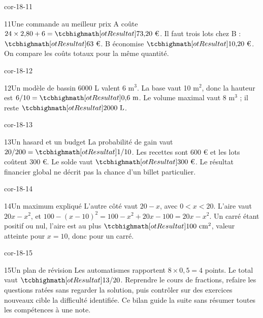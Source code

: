 \begin{blocLivre}{cor-18-11}\begin{corrige}{11}{Une commande au meilleur prix}
A coûte $24\times2{,}80+6=\res{73{,}20\text{ €}}$. Il faut trois lots chez B : $\res{63\text{ €}}$. B économise $\res{10{,}20\text{ €}}$. On compare les coûts totaux pour la même quantité.
\end{corrige}\end{blocLivre}
\begin{blocLivre}{cor-18-12}\begin{corrige}{12}{Un modèle de bassin}
6000 L valent 6 m$^3$. La base vaut 10 m$^2$, donc la hauteur est $6/10=\res{0{,}6\text{ m}}$. Le volume maximal vaut 8 m$^3$ ; il reste $\res{2000\text{ L}}$.
\label{fig-cor-18-12}
\end{corrige}\end{blocLivre}
\begin{blocLivre}{cor-18-13}\begin{corrige}{13}{Un hasard et un budget}
La probabilité de gain vaut $20/200=\res{1/10}$. Les recettes sont 600 € et les lots coûtent 300 €. Le solde vaut $\res{300\text{ €}}$. Le résultat financier global ne décrit pas la chance d’un billet particulier.
\end{corrige}\end{blocLivre}
\begin{blocLivre}{cor-18-14}\begin{corrige}{14}{Un maximum expliqué}
L’autre côté vaut $20-x$, avec $0<x<20$. L’aire vaut $20x-x^2$, et $100-(x-10)^2=100-x^2+20x-100=20x-x^2$. Un carré étant positif ou nul, l’aire est au plus $\res{100\text{ cm}^2}$, valeur atteinte pour $x=10$, donc pour un carré.
\label{fig-cor-18-14}
\end{corrige}\end{blocLivre}
\begin{blocLivre}{cor-18-15}\begin{corrige}{15}{Un plan de révision}
Les automatismes rapportent $8\times0{,}5=4$ points. Le total vaut $\res{13/20}$. Reprendre le cours de fractions, refaire les questions ratées sans regarder la solution, puis contrôler sur des exercices nouveaux cible la difficulté identifiée. Ce bilan guide la suite sans résumer toutes les compétences à une note.
\end{corrige}\end{blocLivre}
